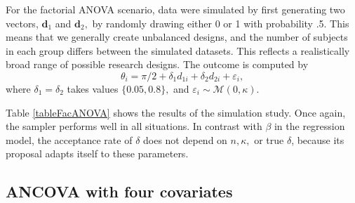 \documentclass[11pt,a4paper]{article}\usepackage[]{graphicx}\usepackage[]{color}
\newcommand{\bd}{\boldsymbol{d}}
\begin{document}
For the factorial ANOVA scenario, data were simulated by first generating two vectors, \( \bd_1 \) and \( \bd_2,\) by randomly drawing either 0 or 1 with probability .5. This means that we generally create unbalanced designs, and the number of subjects in each group differs between the simulated datasets. This reflects a realistically broad range of possible research designs. The outcome is computed by
\begin{equation}
\theta_i = \pi/2 + \delta_1 d_{1i} + \delta_2 d_{2i} + \varepsilon_i,
\end{equation}
where \( \delta_1 = \delta_2 \) takes values \( \{ 0.05, 0.8 \},\) and \( \varepsilon_i \sim \mathcal{M}(0, \kappa).\)

Table \ref{tableFacANOVA} shows the results of the simulation study. Once again, the sampler performs well in all situations. In contrast with \( \beta \) in the regression model, the  acceptance rate of \( \delta \) does not depend on \( n, \kappa, \) or true \( \delta \),  because its proposal adapts itself to these parameters.

\subsection{ANCOVA with four covariates}
\end{document}
